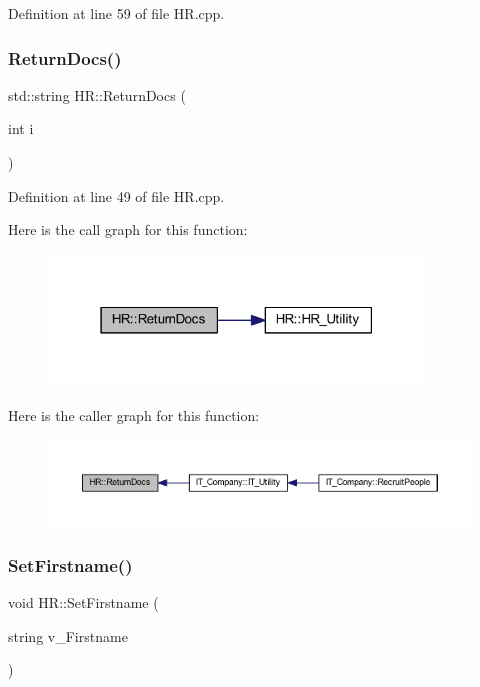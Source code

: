 Definition at line 59 of file H\+R.\+cpp.

\mbox{\label{class_h_r_a0047e05a0a5ebee5dfafe50fe61ee373}} 
\subsubsection{\texorpdfstring{Return\+Docs()}{ReturnDocs()}}
{\footnotesize\ttfamily std\+::string H\+R\+::\+Return\+Docs (\begin{DoxyParamCaption}\item[{int}]{i }\end{DoxyParamCaption})}



Definition at line 49 of file H\+R.\+cpp.

Here is the call graph for this function\+:
\nopagebreak
\begin{figure}[H]
\begin{center}
\leavevmode
\includegraphics[width=283pt]{class_h_r_a0047e05a0a5ebee5dfafe50fe61ee373_cgraph}
\end{center}
\end{figure}
Here is the caller graph for this function\+:
\nopagebreak
\begin{figure}[H]
\begin{center}
\leavevmode
\includegraphics[width=350pt]{class_h_r_a0047e05a0a5ebee5dfafe50fe61ee373_icgraph}
\end{center}
\end{figure}
\mbox{\label{class_h_r_a795d089594c22910ea58938faf131b67}} 
\subsubsection{\texorpdfstring{Set\+Firstname()}{SetFirstname()}}
{\footnotesize\ttfamily void H\+R\+::\+Set\+Firstname (\begin{DoxyParamCaption}\item[{string}]{v\+\_\+\+Firstname }\end{DoxyParamCaption})}



